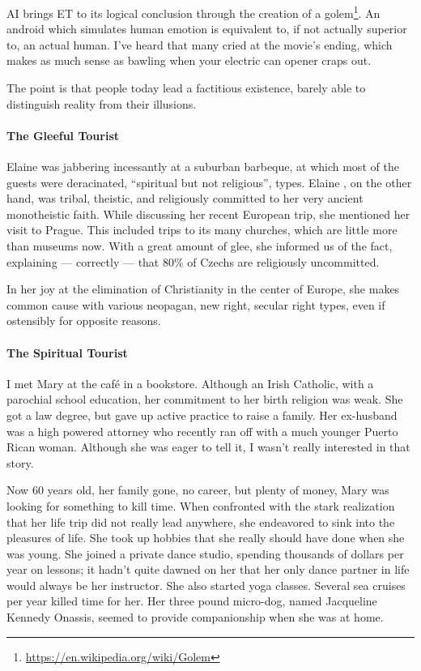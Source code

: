AI brings ET to its logical conclusion through the creation of a golem\footnote{\url{https://en.wikipedia.org/wiki/Golem}}. An android which simulates human emotion is equivalent to, if not actually superior to, an actual human. I've heard that many cried at the movie's ending, which makes as much sense as bawling when your electric can opener craps out.

The point is that people today lead a factitious existence, barely able to distinguish reality from their illusions.

\paragraph{The Gleeful Tourist}


Elaine was jabbering incessantly at a suburban barbeque, at which most of the guests were deracinated, ``spiritual but not religious'', types. Elaine , on the other hand, was tribal, theistic, and religiously committed to her very ancient monotheistic faith. While discussing her recent European trip, she mentioned her visit to Prague. This included trips to its many churches, which are little more than museums now. With a great amount of glee, she informed us of the fact, explaining --- correctly --- that 80\% of Czechs are religiously uncommitted.

In her joy at the elimination of Christianity in the center of Europe, she makes common cause with various neopagan, new right, secular right types, even if ostensibly for opposite reasons.

\paragraph{The Spiritual Tourist}


I met Mary at the café in a bookstore. Although an Irish Catholic, with a parochial school education, her commitment to her birth religion was weak. She got a law degree, but gave up active practice to raise a family. Her ex-husband was a high powered attorney who recently ran off with a much younger Puerto Rican woman. Although she was eager to tell it, I wasn't really interested in that story.

Now 60 years old, her family gone, no career, but plenty of money, Mary was looking for something to kill time. When confronted with the stark realization that her life trip did not really lead anywhere, she endeavored to sink into the pleasures of life. She took up hobbies that she really should have done when she was young. She joined a private dance studio, spending thousands of dollars per year on lessons; it hadn't quite dawned on her that her only dance partner in life would always be her instructor. She also started yoga classes. Several sea cruises per year killed time for her. Her three pound micro-dog, named Jacqueline Kennedy Onassis, seemed to provide companionship when she was at home.

